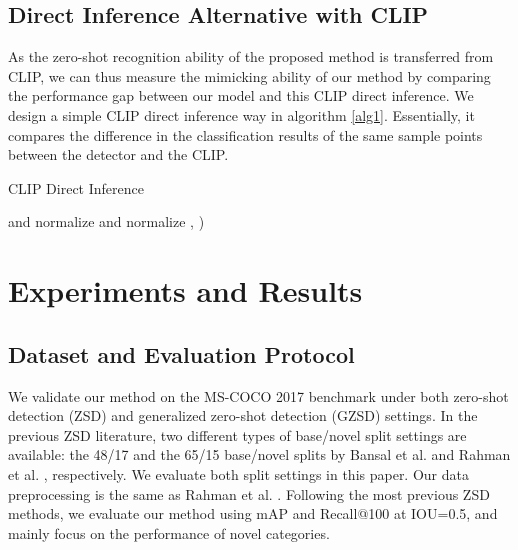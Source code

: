 \documentclass[10pt,twocolumn,letterpaper]{article}
\begin{document}
\subsection{Direct Inference Alternative with CLIP}
As the zero-shot recognition ability of the proposed method is transferred from CLIP, we can thus measure the mimicking ability of our method by comparing the performance gap between our model and this CLIP direct inference. We design a simple CLIP direct inference way in algorithm \ref{alg1}. Essentially, it compares the difference in the classification results of the same sample points between the detector and the CLIP.

\vspace{-0.4em}

\begin{algorithm}
\caption{CLIP Direct Inference}
\label{alg1}
 and normalize\;
\For{}
{\;
\; 
 and normalize\;
\;
, )\;}
\end{algorithm}
\vspace{-2.0em}



\section{Experiments and Results}
\subsection{Dataset and Evaluation Protocol}
We validate our method on the MS-COCO 2017 benchmark under both zero-shot detection (ZSD) and generalized zero-shot detection (GZSD) settings. In the previous ZSD literature, two different types of base/novel split settings are available: the 48/17 and the 65/15 base/novel splits by Bansal et al. \cite{bansal2018zero} and Rahman et al. \cite{rahman2020improved}, respectively. We evaluate both split settings in this paper. Our data preprocessing is the same as Rahman et al. \cite{zareian2021open}. Following the most previous ZSD methods, we evaluate our method using mAP and Recall@100 at IOU=0.5, and mainly focus on the performance of novel categories.  
\end{document}
